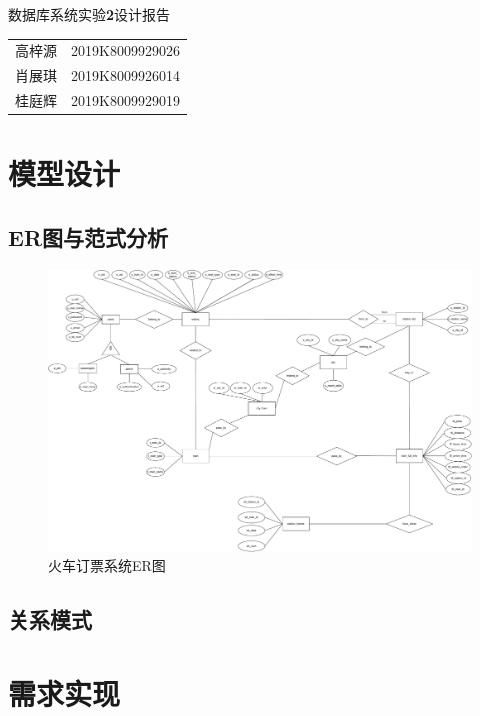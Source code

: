 \documentclass[UTF-8,twoside,cs4size]{ctexart}
\begin{document}
	\begin{center}
		\heiti{}
		数据库系统实验\textbf{2}设计报告
	\end{center}

	\begin{table}[!h]
        \raggedleft
        \begin{tabular}{rc}
            高梓源 & 2019K8009929026\\
            肖展琪 & 2019K8009926014\\
            桂庭辉 & 2019K8009929019
        \end{tabular}
    \end{table}
    
    \section{模型设计}
    \subsection{\textbf{ER}图与范式分析}
    
    \begin{figure}[!h]
        \centering
        \includegraphics*[width=\textwidth]{RE_2.pdf}
        \caption{火车订票系统ER图}
    \end{figure}
    
    
    
    \subsection{关系模式}
    
    \section{需求实现}
\end{document}
